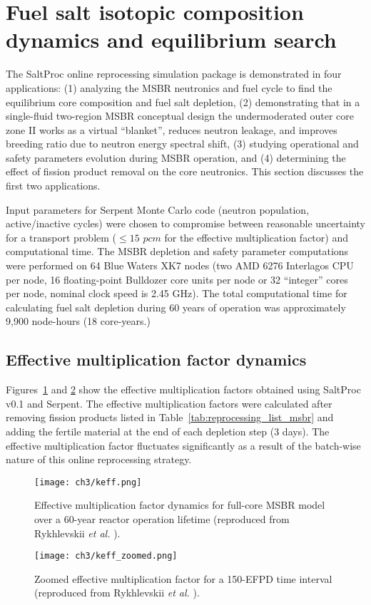 \section{Fuel salt isotopic composition dynamics and equilibrium search}
\label{sec:equilibrium_search}
The SaltProc online reprocessing simulation package is demonstrated in four 
applications: 
(1) analyzing the \gls{MSBR} neutronics and fuel cycle to find 
the equilibrium core composition and fuel salt depletion, 
(2) demonstrating that in a single-fluid two-region \gls{MSBR} conceptual 
design the undermoderated outer core zone II works as a virtual ``blanket'', 
reduces neutron leakage, and improves breeding ratio due to neutron energy 
spectral shift,
(3) studying operational and safety parameters evolution during \gls{MSBR} 
operation, and
(4) determining the effect of fission product removal on the core neutronics. 
This section discusses the first two applications.

Input parameters for Serpent Monte Carlo code (neutron population, 
active/inactive cycles) were chosen to compromise between reasonable 
uncertainty for a transport problem ($\leq 15$ $pcm$ for the effective 
multiplication factor) and computational time. The \gls{MSBR} 
depletion and safety parameter computations were performed on 64 Blue Waters 
XK7 nodes (two AMD 6276 Interlagos CPU per node, 16 floating-point Bulldozer 
core units per node or 32 ``integer'' cores per node, nominal clock speed is 
2.45 GHz). The total computational time for calculating fuel salt depletion  
during 60 years of operation was approximately 9,900 node-hours (18 
core-years.)

\subsection{Effective multiplication factor dynamics}
Figures~\ref{fig:keff} and \ref{fig:keff_zoomed} show the effective 
multiplication factors obtained using SaltProc v0.1 and Serpent. The effective 
multiplication factors were calculated after removing fission products listed 
in Table~\ref{tab:reprocessing_list_msbr} and adding the fertile material at 
the end of each depletion step (3 days). The effective multiplication factor 
fluctuates significantly as a result of the batch-wise nature of this online 
reprocessing strategy. 
\begin{figure}[ht!] 
	\centering
	\texttt{[image: ch3/keff.png]}
	\caption{Effective multiplication factor dynamics for full-core \gls{MSBR} 
		model over a 60-year reactor operation lifetime (reproduced 
		from Rykhlevskii \emph{et al.} \cite{rykhlevskii_modeling_2019}).}
	\label{fig:keff}
\end{figure}
\begin{figure}[ht!] 
	\centering
	\texttt{[image: ch3/keff\_zoomed.png]}
	\caption{Zoomed effective multiplication factor for a 150-EFPD time 
	interval (reproduced from Rykhlevskii \emph{et al.}  
	\cite{rykhlevskii_modeling_2019}).}
	\label{fig:keff_zoomed}
\end{figure}


